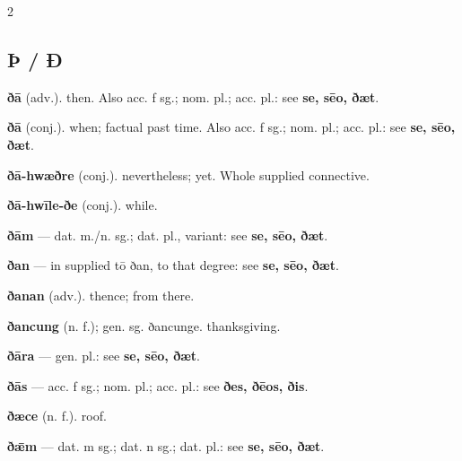 \begin{multicols*}{2}
\subsection*{Þ / Ð}
\textbf{ðā} (adv.). then. Also acc. f sg.; nom. pl.; acc. pl.: see \textbf{se, sēo, ðæt}.\par
\textbf{ðā} (conj.). when; factual past time. Also acc. f sg.; nom. pl.; acc. pl.: see \textbf{se, sēo, ðæt}.\par
\textbf{ðā-hwæðre} (conj.). nevertheless; yet. Whole supplied connective.\par
\textbf{ðā-hwīle-ðe} (conj.). while.\par
\textbf{ðām} — dat. m./n. sg.; dat. pl., variant: see \textbf{se, sēo, ðæt}.\par
\textbf{ðan} — in supplied tō ðan, to that degree: see \textbf{se, sēo, ðæt}.\par
\textbf{ðanan} (adv.). thence; from there.\par
\textbf{ðancung} (n. f.); gen. sg. ðancunge. thanksgiving.\par
\textbf{ðāra} — gen. pl.: see \textbf{se, sēo, ðæt}.\par
\textbf{ðās} — acc. f sg.; nom. pl.; acc. pl.: see \textbf{ðes, ðēos, ðis}.\par
\textbf{ðæce} (n. f.). roof.\par
\textbf{ðǣm} — dat. m sg.; dat. n sg.; dat. pl.: see \textbf{se, sēo, ðæt}.\par

\end{multicols*}
